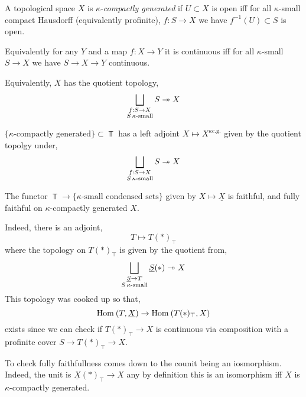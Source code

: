 \documentclass[12pt]{article}
\newcommand{\ul}[1]{\underline{#1}}
\begin{document}
\begin{defn}
A topological space $X$ is $\kappa$-\textit{compactly generated} if $U \subset X$ is open iff for all $\kappa$-small compact Hausdorff (equivalently profinite), $f : S \to X$ we have $f^{-1}(U) \subset S$ is open. 
\end{defn}

\begin{rmk}
Equivalently for any $Y$ and a map $f : X \to Y$ it is continuous iff for all $\kappa$-small $S \to X$ we have $S \to X \to Y$ continuous. 
\end{rmk}

\begin{rmk}
Equivalently, $X$ has the quotient topology,
\[ \bigsqcup_{\substack{f : S \to X \\ S \, \kappa\text{-small}}} S \twoheadrightarrow X \]
\end{rmk}

\begin{prop}
$\{ \kappa\text{-compactly generated} \} \subset \Top$ has a left adjoint $X \mapsto X^{\kappa\text{c.g.}}$ given by the quotient topolgy under,
\[ \bigsqcup_{\substack{f : S \to X \\ S \, \kappa\text{-small}}} S \twoheadrightarrow X \]
\end{prop}

\begin{prop}
The functor $\Top \to \{ \kappa\text{-small condensed sets}\}$ given by $X \mapsto \underline{X}$ is faithful, and fully faithful on $\kappa$-compactly generated $X$.
\end{prop}

\begin{rmk}
Indeed, there is an adjoint,
\[ T \mapsto T(*)_{\top} \]
where the topology on $T(*)_{\top}$ is given by the quotient from,
\[ \bigsqcup_{\substack{\underline{S} \to T \\ S \, \kappa\text{-small}}} \underline{S}(*) \twoheadrightarrow X \]
This topology was cooked up so that,
\[ \mathrm{Hom}_{} \left( T, \underline{X} \right) \to \mathrm{Hom}_{} \left( T(*)_{\top}, X \right) \]
exists since we can check if $T(*)_\top \to X$ is continuous via composition with a profinite cover $S \to T(*)_{\top} \to X$.
\end{rmk}

\begin{rmk}
To check fully faithfullness comes down to the counit being an iosmorphism. Indeed, the unit is $\ul{X}(*)_\top \to X$ any by definition this is an isomorphism iff $X$ is $\kappa$-compactly generated. 
\end{rmk}
\end{document}
